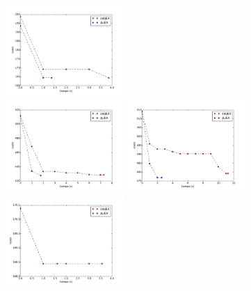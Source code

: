 \begin{columns}[t]
\centering
\includegraphics[width=4.5cm,height=3.5cm]{./evaluacion_experimental/fitness_sobre_tiempo/chicas_1.pdf}\\
\includegraphics[width=4.5cm,height=3.5cm]{./evaluacion_experimental/fitness_sobre_tiempo/medianas_2.pdf}
\centering
\includegraphics[width=4.5cm,height=3.5cm]{./evaluacion_experimental/fitness_sobre_tiempo/grandes_2.pdf}\\
\includegraphics[width=4.5cm,height=3.5cm]{./evaluacion_experimental/fitness_sobre_tiempo/montevideo_1.pdf}
\end{columns}